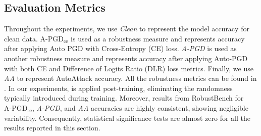 \documentclass[conference]{IEEEtran}
\begin{document}
\subsection{Evaluation Metrics} \label{sec:eval_metric}
Throughout the experiments, we use \emph{Clean} to represent the model accuracy for clean data. \emph{$\text{A-PGD}_{\text{ce}}$}  is used as a robustness measure and represents accuracy after applying Auto PGD with Cross-Entropy (CE) loss. \emph{A-PGD} is used as another robustness measure and represents accuracy after applying Auto-PGD with both CE and Difference of Logits Ratio (DLR) loss metrics. Finally, we use \emph{AA} to represent AutoAttack accuracy. All the robustness metrics can be found in \cite{reoch20}. In our experiments, \sys is applied post-training, eliminating the randomness typically introduced during training. Moreover, results from RobustBench for \emph{$\text{A-PGD}_{\text{ce}}$}, \emph{A-PGD}, and \emph{AA} accuracies are highly consistent, showing negligible variability. Consequently, statistical significance tests are almost zero for all the results reported in this section.
\end{document}
